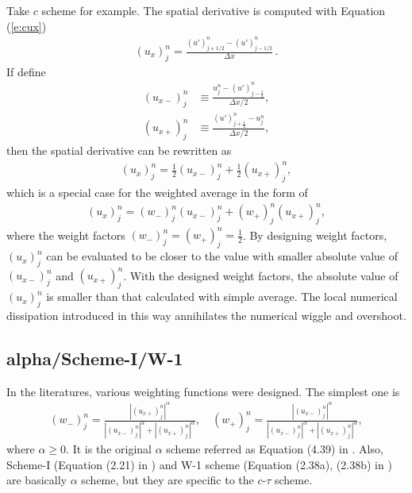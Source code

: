 \documentclass[letterpaper,12pt,dvips]{article}
\numberwithin{equation}{section}
\begin{document}
Take $c$ scheme for example. 
The spatial derivative is computed with Equation (\ref{e:cux})
\begin{align*}
  (u_x)_j^n = \frac{(u')_{j+1/2}^n - (u')_{j-1/2}^n}{\Delta x}\,.
\end{align*}
If define
\begin{align}
  (u_{x-})_j^n &\equiv 
    \frac{u_j^n - (u')_{j-\frac{1}{2}}^n}{\Delta x/2}, \label{e:ux-} \\
  (u_{x+})_j^n &\equiv 
    \frac{(u')_{j+\frac{1}{2}}^n - u_j^n}{\Delta x/2}, \label{e:ux+}
\end{align}
then the spatial derivative can be rewritten as 
\begin{align*}
  (u_x)_j^n = \frac{1}{2}(u_{x-})_j^n + \frac{1}{2}(u_{x+})_j^n, 
\end{align*}
which is a special case for the weighted average in the form of 
\begin{align}
  (u_x)_j^n = (w_-)_j^n(u_{x-})_j^n + (w_+)_j^n(u_{x+})_j^n
    , \label{e:weighting}
\end{align}
where the weight factors $(w_-)_j^n=(w_+)_j^n=\frac{1}{2}$.
By designing weight factors, $(u_x)_j^n$ can be evaluated to be closer 
to the value with smaller absolute value of $(u_{x-})_j^n$ and 
$(u_{x+})_j^n$.
With the designed weight factors, the absolute value of $(u_x)_j^n$ is 
smaller than that calculated with simple average.
The local numerical dissipation introduced in this way annihilates 
the numerical wiggle and overshoot\cite{b:chang03}.

\subsection{alpha/Scheme-I/W-1}

In the literatures, various weighting functions were 
designed\cite{b:chang95, b:chang02, b:chang03}.
The simplest one is 
\begin{align}
  (w_-)_j^n = 
    \frac{|(u_{x+})_j^n|^{\alpha}}
         {|(u_{x-})_j^n|^{\alpha}+|(u_{x+})_j^n|^{\alpha}}, \quad
  (w_+)_j^n = 
    \frac{|(u_{x-})_j^n|^{\alpha}}
         {|(u_{x-})_j^n|^{\alpha}+|(u_{x+})_j^n|^{\alpha}}, \label{e:alpha}
\end{align}
where $\alpha\ge0$.
It is the original $\alpha$ scheme referred as Equation (4.39) in 
\cite{b:chang95}.
Also, Scheme-I (Equation (2.21) in \cite{b:chang02}) and W-1 scheme 
(Equation (2.38a), (2.38b) in \cite{b:chang03}) are basically $\alpha$
scheme, but they are specific to the $c$-$\tau$ scheme.
\end{document}
